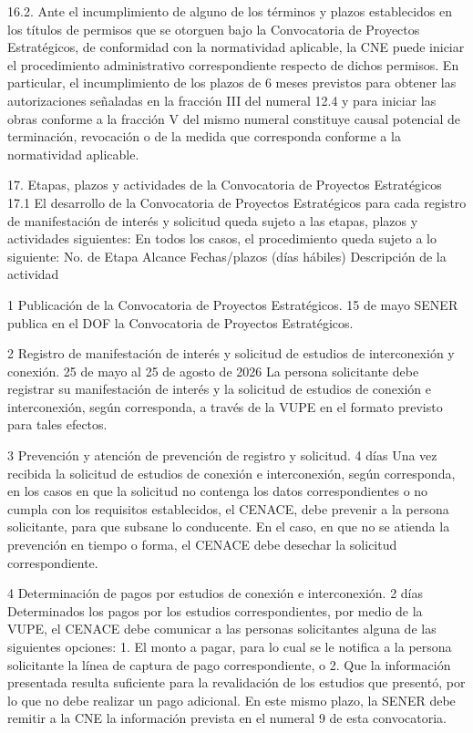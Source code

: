 16.2. Ante el incumplimiento de alguno de los términos y plazos establecidos en los títulos de permisos que se otorguen bajo la Convocatoria de Proyectos Estratégicos, de conformidad con la normatividad aplicable, la CNE puede iniciar el procedimiento administrativo correspondiente respecto de dichos permisos. En particular, el incumplimiento de los plazos de 6 meses previstos para obtener las autorizaciones señaladas en la fracción III del numeral 12.4 y para iniciar las obras conforme a la fracción V del mismo numeral constituye causal potencial de terminación, revocación o de la medida que corresponda conforme a la normatividad aplicable.\par
17. Etapas, plazos y actividades de la Convocatoria de Proyectos Estratégicos
17.1 El desarrollo de la Convocatoria de Proyectos Estratégicos para cada registro de manifestación de interés y solicitud queda sujeto a las etapas, plazos y actividades siguientes:
En todos los casos, el procedimiento queda sujeto a lo siguiente:
No. de Etapa
 Alcance
 Fechas/plazos (días hábiles)
 Descripción de la actividad
 
 1
 Publicación de la Convocatoria de Proyectos Estratégicos.
 15 de mayo
 SENER publica en el DOF la Convocatoria de Proyectos Estratégicos.
 
 2
 Registro de manifestación de interés y solicitud de estudios de interconexión y conexión.
 25 de mayo al 25 de agosto de 2026
 La persona solicitante debe registrar su manifestación de interés y la solicitud de estudios de conexión e interconexión, según corresponda, a través de la VUPE en el formato previsto para tales efectos. 
 
 3
 Prevención y atención de prevención de registro y solicitud.
 4 días
 Una vez recibida la solicitud de estudios de conexión e interconexión, según corresponda, en los casos en que la solicitud no contenga los datos correspondientes o no cumpla con los requisitos establecidos, el CENACE, debe prevenir a la persona solicitante, para que subsane lo conducente.
En el caso, en que no se atienda la prevención en tiempo o forma, el CENACE debe desechar la solicitud correspondiente.
 
 4
 Determinación de pagos por estudios de conexión e interconexión.
 2 días
 Determinados los pagos por los estudios correspondientes, por medio de la VUPE, el CENACE debe comunicar a las personas solicitantes alguna de las siguientes opciones:
1.	El monto a pagar, para lo cual se le notifica a la persona solicitante la línea de captura de pago correspondiente, o
2.	Que la información presentada resulta suficiente para la revalidación de los estudios que presentó, por lo que no debe realizar un pago adicional.
En este mismo plazo, la SENER debe remitir a la CNE la información prevista en el numeral 9 de esta convocatoria.
 
